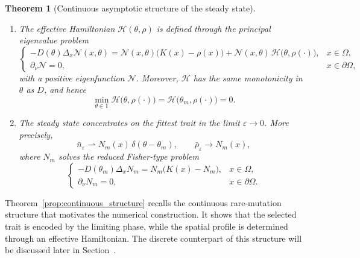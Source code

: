 \documentclass[11pt]{article}
\newtheorem{theorem}{Theorem}[section]
\begin{document}
\begin{theorem}[Continuous asymptotic structure of the steady state]
\begin{enumerate}
\item The effective Hamiltonian \(\mathcal H(\theta,\rho)\) is defined through the principal eigenvalue problem
\begin{equation}\label{eq:eigen_N}
\begin{cases}
-D(\theta)\Delta_x \mathcal N(x,\theta)
= \mathcal N(x,\theta)\bigl(K(x)-\rho(x)\bigr)
+ \mathcal N(x,\theta)\,\mathcal H\bigl(\theta,\rho(\cdot)\bigr), & x\in\Omega,\\
\partial_\nu \mathcal N = 0, & x\in\partial\Omega,
\end{cases}
\end{equation}
with a positive eigenfunction \(\mathcal N\). Moreover, \(\mathcal H\) has the same monotonicity in \(\theta\) as \(D\), and hence
\begin{equation}\label{eq:H_min_zero}
\min_{\theta\in\mathbb T} \mathcal H\bigl(\theta,\rho(\cdot)\bigr)
=
\mathcal H\bigl(\theta_m,\rho(\cdot)\bigr)
=0.
\end{equation}

\item The steady state concentrates on the fittest trait in the limit \(\varepsilon\to0\). More precisely,
\begin{equation}\label{eq:continuous_dirac_limit}
\bar n_\varepsilon \rightharpoonup N_m(x)\,\delta(\theta-\theta_m),
\qquad
\bar\rho_\varepsilon \to N_m(x),
\end{equation}
where \(N_m\) solves the reduced Fisher-type problem
\begin{equation}\label{eq:Nm_problem}
\begin{cases}
-D(\theta_m)\Delta_x N_m = N_m\bigl(K(x)-N_m\bigr), & x\in\Omega,\\
\partial_\nu N_m = 0, & x\in\partial\Omega.
\end{cases}
\end{equation}
\end{enumerate}
\end{theorem}


Theorem~\ref{prop:continuous_structure} recalls the continuous
rare-mutation structure that motivates the numerical construction.  It
shows that the selected trait is encoded by the limiting phase, while the
spatial profile is determined through an effective Hamiltonian. 
The discrete counterpart of this structure will be discussed later in Section~\label{sec:WKB_scheme}.




\end{document}
